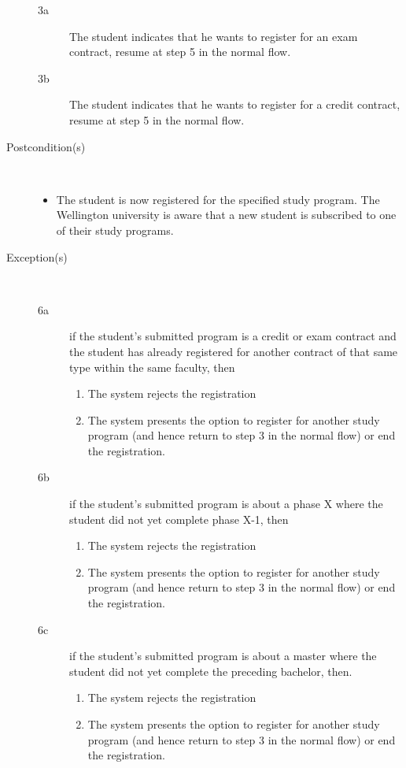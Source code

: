 \begin{description}
	\begin{description}
		\item[3a] The student indicates that he wants to register for an exam
		contract, resume at step 5 in the normal flow.
		\item[3b] The student indicates that he wants to register for a credit
		contract, resume at step 5 in the normal flow.
	\end{description}
	\item[Postcondition(s)] \ 
	\begin{itemize}
		\item The student is now registered for the specified study program. The
		Wellington university is aware that a new student is subscribed to one of
		their study programs.
	\end{itemize}
	\item[Exception(s)] \ 
	\begin{description}
		\item[6a] if the student's submitted program is a credit or exam contract and
		the student has already registered for another contract of that same type
		within the same faculty, then
		\begin{enumerate}
		  \item The system rejects the registration
		  \item The system presents the option to register for another study program
		  (and hence return to step 3 in the normal flow) or end the registration.
		\end{enumerate}
		\item[6b] if the student's submitted program is about a phase X where the
		student did not yet complete phase X-1, then
		\begin{enumerate}
		 	\item The system rejects the registration
		 	\item The system presents the option to register for another study program
		 	(and hence return to step 3 in the normal flow) or end the registration.
		\end{enumerate}
		\item[6c] if the student's submitted program is about a master where the
		student did not yet complete the preceding bachelor, then.
		\begin{enumerate}
		 	\item The system rejects the registration
		 	\item The system presents the option to register for another study program
		 	(and hence return to step 3 in the normal flow) or end the registration.
		\end{enumerate}
	\end{description}
\end{description}
